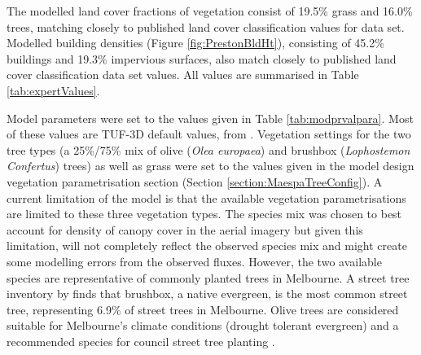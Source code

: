 \documentclass[preprint,12pt,authoryear]{elsarticle}
\begin{document}
The modelled land cover fractions of vegetation consist of 19.5\% grass and 16.0\% trees, matching closely to published land cover classification values for data set. Modelled building densities (Figure \ref{fig:PrestonBldHt}), consisting of 45.2\% buildings and 19.3\% impervious surfaces, also match closely to published land cover classification data set values. All values are summarised in Table \ref{tab:expertValues}.

Model parameters were set to the values given in Table \ref{tab:modprvalpara}. Most of these values are TUF-3D default values, from \cite{Krayenhoff2007}. Vegetation settings for the two tree types (a 25\%/75\% mix of olive (\textit{Olea europaea}) and brushbox (\textit{Lophostemon Confertus}) trees) as well as grass were set to the values given in the model design vegetation parametrisation section (Section \ref{section:MaespaTreeConfig}). A current limitation of the model is that the available vegetation parametrisations are limited to these three vegetation types. The species mix was chosen to best account for density of canopy cover in the aerial imagery but given this limitation, will not completely reflect the observed species mix and might create some modelling errors from the observed fluxes. However, the two available species are representative of commonly planted trees in Melbourne. A street tree inventory by \cite{Frank2006} finds that brushbox, a native evergreen, is the most common street tree, representing 6.9\% of street trees in Melbourne. Olive trees are considered suitable for Melbourne's climate conditions (drought tolerant evergreen) and a recommended species for council street tree planting \citep{PortPhillip2010}.
\end{document}
